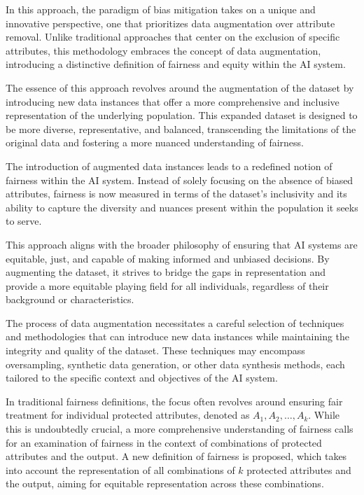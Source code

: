 In this approach, the paradigm of bias mitigation takes on a unique and innovative perspective, one that prioritizes data augmentation over attribute removal. Unlike traditional approaches that center on the exclusion of specific attributes, this methodology embraces the concept of data augmentation, introducing a distinctive definition of fairness and equity within the AI system.

The essence of this approach revolves around the augmentation of the dataset by introducing new data instances that offer a more comprehensive and inclusive representation of the underlying population. This expanded dataset is designed to be more diverse, representative, and balanced, transcending the limitations of the original data and fostering a more nuanced understanding of fairness. 

The introduction of augmented data instances leads to a redefined notion of fairness within the AI system. Instead of solely focusing on the absence of biased attributes, fairness is now measured in terms of the dataset's inclusivity and its ability to capture the diversity and nuances present within the population it seeks to serve. 

This approach aligns with the broader philosophy of ensuring that AI systems are equitable, just, and capable of making informed and unbiased decisions. By augmenting the dataset, it strives to bridge the gaps in representation and provide a more equitable playing field for all individuals, regardless of their background or characteristics. 

The process of data augmentation necessitates a careful selection of techniques and methodologies that can introduce new data instances while maintaining the integrity and quality of the dataset. These techniques may encompass oversampling, synthetic data generation, or other data synthesis methods, each tailored to the specific context and objectives of the AI system.

In traditional fairness definitions, the focus often revolves around ensuring fair treatment for individual protected attributes, denoted as $A_1, A_2, \ldots, A_k$. While this is undoubtedly crucial, a more comprehensive understanding of fairness calls for an examination of fairness in the context of combinations of protected attributes and the output. A new definition of fairness is proposed, which takes into account the representation of all combinations of $k$ protected attributes and the output, aiming for equitable representation across these combinations.


